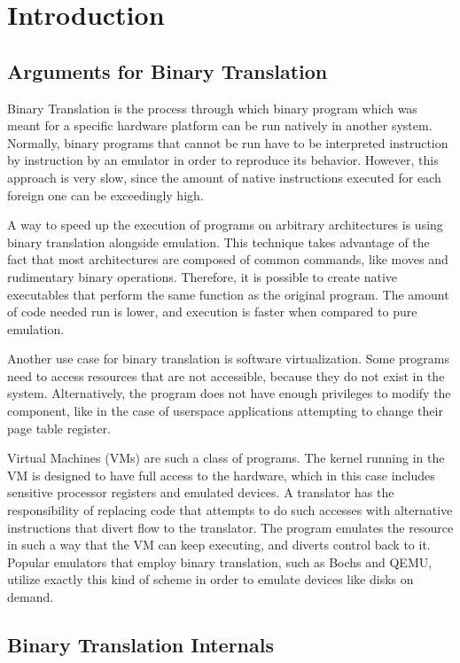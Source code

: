 \section{Introduction}

\subsection{Arguments for Binary Translation}

Binary Translation is the process through which binary program which was meant for a
specific hardware platform can be run natively in another system.  Normally, binary
programs that cannot be run have to be interpreted instruction by instruction
by an emulator in order to reproduce its behavior.  However, this approach is
very slow, since the amount of native instructions executed for each foreign
one can be exceedingly high.

A way to speed up the execution of programs on arbitrary architectures is using
binary translation alongside emulation.  This technique takes advantage of the
fact that most architectures are composed of common commands, like moves and
rudimentary binary operations.  Therefore, it is possible to create native
executables that perform the same function as the original program.  The amount
of code needed run is lower, and execution is faster when compared to pure emulation.

Another use case for binary translation is software virtualization.  Some
programs need to access resources that are not accessible, because they do not
exist in the system.  Alternatively, the program does not have enough
privileges to modify the component, like in the case of userspace applications
attempting to change their page table register.

Virtual Machines (VMs) are such a class of programs.  The kernel running in the
VM is designed to have full access to the hardware, which in this case includes
sensitive processor registers and emulated devices.  A translator has the
responsibility of replacing code that attempts to do such accesses with
alternative instructions that divert flow to the translator.  The program
emulates the resource in such a way that the VM can keep executing, and diverts
control back to it.  Popular emulators that employ binary translation, such as
Bochs and QEMU, utilize exactly this kind of scheme in order to emulate devices
like disks on demand.

\subsection{Binary Translation Internals}

